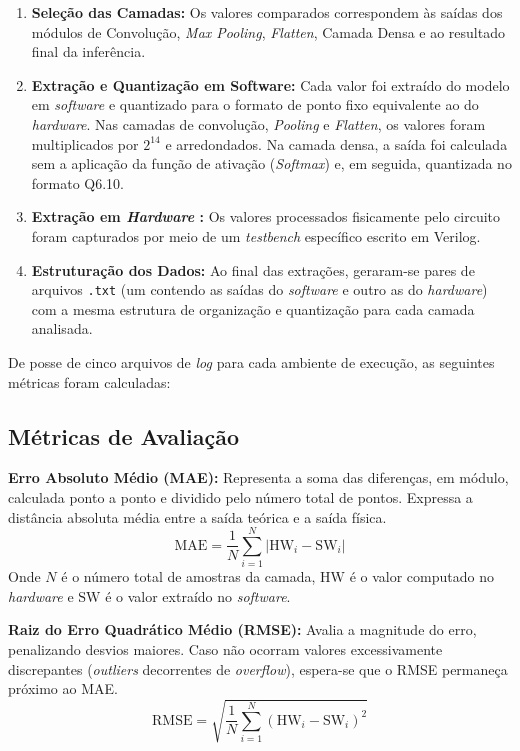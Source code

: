 \begin{enumerate}
    \item \textbf{Seleção das Camadas:} Os valores comparados correspondem às saídas dos módulos de Convolução, \textit{Max \textit{Pooling}}, \textit{Flatten}, Camada Densa e ao resultado final da inferência.
    \item \textbf{Extração e Quantização em Software:} Cada valor foi extraído do modelo em \textit{software} e quantizado para o formato de ponto fixo equivalente ao do \textit{hardware}. Nas camadas de convolução, \textit{Pooling} e \textit{Flatten}, os valores foram multiplicados por $2^{14}$ e arredondados. Na camada densa, a saída foi calculada sem a aplicação da função de ativação (\textit{Softmax}) e, em seguida, quantizada no formato Q6.10.
    \item \textbf{Extração em \textit{Hardware} :} Os valores processados fisicamente pelo circuito foram capturados por meio de um \textit{testbench} específico escrito em Verilog.
    \item \textbf{Estruturação dos Dados:} Ao final das extrações, geraram-se pares de arquivos \texttt{.txt} (um contendo as saídas do \textit{software} e outro as do \textit{hardware}) com a mesma estrutura de organização e quantização para cada camada analisada.
\end{enumerate}

De posse de cinco arquivos de \textit{log} para cada ambiente de execução, as seguintes métricas foram calculadas:
\subsection{Métricas de Avaliação}

\noindent\textbf{Erro Absoluto Médio (MAE):} Representa a soma das diferenças, em módulo, calculada ponto a ponto e dividido pelo número total de pontos. Expressa a distância absoluta média entre a saída teórica e a saída física.
\begin{equation}
\text{MAE} = \frac{1}{N} \sum_{i=1}^{N} \left| \text{HW}_i - \text{SW}_i \right|
\end{equation}
Onde $N$ é o número total de amostras da camada, $\text{HW}$ é o valor computado no \textit{hardware} e $\text{SW}$ é o valor extraído no \textit{software}.

\noindent\textbf{Raiz do Erro Quadrático Médio (RMSE):} Avalia a magnitude do erro, penalizando desvios maiores. Caso não ocorram valores excessivamente discrepantes (\textit{outliers} decorrentes de \textit{overflow}), espera-se que o RMSE permaneça próximo ao MAE.
\begin{equation}
\text{RMSE} = \sqrt{\frac{1}{N} \sum_{i=1}^{N} \left( \text{HW}_i - \text{SW}_i \right)^2}
\end{equation}

